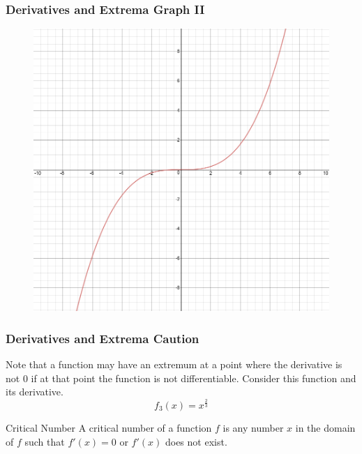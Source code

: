 \documentclass[xcolor=dvipsnames]{beamer}
\begin{document}
\begin{frame}
  \frametitle{Derivatives and Extrema Graph II}
  \begin{figure}[h]
    \includegraphics[scale=.3]{./diagrams/extrema2.png}
  \end{figure}
\end{frame}

\begin{frame}
  \frametitle{Derivatives and Extrema Caution}
Note that a function may have an extremum at a point where the
derivative is not $0$ if at that point the function is not
differentiable. Consider this function and its derivative.
\begin{equation}
  \label{eq:ceezukoh}
f_{3}(x)=x^{\frac{2}{3}}
\end{equation}
\begin{block}{Critical Number}
  A \alert{critical number} of a function $f$ is any number $x$ in the
  domain of $f$ such that $f'(x)=0$ or $f'(x)$ does not exist.
\end{block}
\end{frame}
\end{document}
